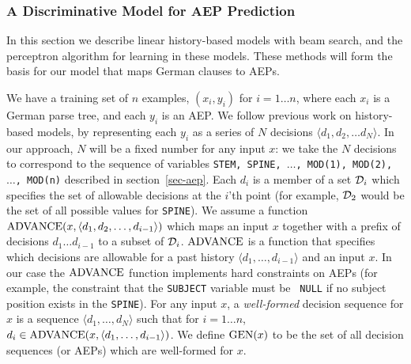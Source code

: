 \documentclass[10pt]{report}
\theoremstyle{plain}
\begin{document}
{\subsubsection{A Discriminative Model for AEP Prediction}
\label{sec-model}
In this section we describe linear history-based models with beam
search, and the perceptron algorithm for learning in these
models. These methods will form the basis for our model that maps
German clauses to AEPs.

We have a training set of $n$ examples, $(x_i,y_i)$ for $i = 1 \ldots
n$, where each $x_i$ is a German parse tree, and each $y_i$ is an AEP.
We follow previous work on history-based models, by representing each
$y_i$ as a series of $N$ decisions $\langle d_1, d_2, \ldots d_N
\rangle$. In our approach, $N$ will be a fixed number for any input
$x$: we take the $N$ decisions to correspond to the sequence of
variables {\tt STEM, SPINE, $\ldots$, MOD(1), MOD(2), $\ldots$,
MOD(n)} described in section~\ref{sec-aep}.  Each $d_i$ is a member of
a set ${\cal D}_i$ which specifies the set of allowable decisions at
the $i$'th point (for example, ${\cal D}_2$ would be the set of all
possible values for {\tt SPINE}).  We assume a function
$\hbox{ADVANCE}(x, \langle d_1, d_2, \ldots, d_{i-1} \rangle)$ which
maps an input $x$ together with a prefix of decisions $d_1 \ldots
d_{i-1}$ to a subset of ${\cal D}_i$. $\hbox{ADVANCE}$ is a function
that specifies which decisions are allowable for a past history
$\langle d_1, \ldots, d_{i-1} \rangle$ and an input $x$. In our case
the $\hbox{ADVANCE}$ function implements hard constraints on AEPs (for
example, the constraint that the {\tt SUBJECT} variable must be {\tt
NULL} if no subject position exists in the {\tt SPINE}).  For any
input $x$, a {\em well-formed} decision sequence for $x$ is a sequence
$\langle d_1, \ldots, d_N \rangle$ such that for $i = 1 \ldots n$,
$d_i \in \hbox{ADVANCE}(x, \langle d_1, \ldots, d_{i-1} \rangle)$. We
define $\hbox{GEN}(x)$ to be the set of all decision sequences (or AEPs)
which are well-formed for $x$.

}
\end{document}
